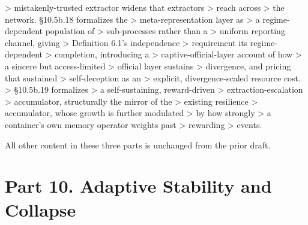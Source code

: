 \documentclass[
]{article}
\begin{document}
\begin{itemize}
  \textgreater{} mistakenly-trusted extractor widens that extractors
  \textgreater{} reach across \textgreater{} the network. §10.5b.18
  formalizes the \textgreater{} meta-representation layer as
  \textgreater{} a regime-dependent population of \textgreater{}
  sub-processes rather than a \textgreater{} uniform reporting channel,
  giving \textgreater{} Definition 6.1's independence \textgreater{}
  requirement its regime-dependent \textgreater{} completion,
  introducing a \textgreater{} captive-official-layer account of how
  \textgreater{} a sincere but access-limited \textgreater{} official
  layer sustains \textgreater{} divergence, and pricing that sustained
  \textgreater{} self-deception as an \textgreater{} explicit,
  divergence-scaled resource cost. \textgreater{} §10.5b.19 formalizes
  \textgreater{} a self-sustaining, reward-driven \textgreater{}
  extraction-escalation \textgreater{} accumulator, structurally the
  mirror of the \textgreater{} existing resilience \textgreater{}
  accumulator, whose growth is further modulated \textgreater{} by how
  strongly \textgreater{} a container's own memory operator weights past
  \textgreater{} rewarding \textgreater{} events.
\end{itemize}

All other content in these three parts is unchanged from the prior
draft.

\hypertarget{part-10.-adaptive-stability-and-collapse}{%
\section{Part 10. Adaptive Stability and
Collapse}\label{part-10.-adaptive-stability-and-collapse}}
\end{document}
